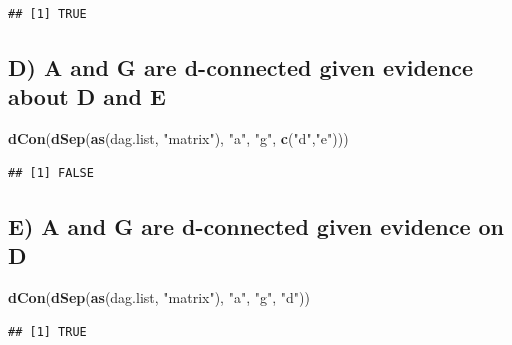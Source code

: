\documentclass[]{article}
\newenvironment{Shaded}{\begin{snugshade}}{\end{snugshade}}
\newcommand{\KeywordTok}[1]{\textcolor[rgb]{0.13,0.29,0.53}{\textbf{{#1}}}}
\newcommand{\StringTok}[1]{\textcolor[rgb]{0.31,0.60,0.02}{{#1}}}
\newcommand{\NormalTok}[1]{{#1}}
\begin{document}
\begin{verbatim}
## [1] TRUE
\end{verbatim}

\subsection{D) A and G are d-connected given evidence about D and
E}\label{d-a-and-g-are-d-connected-given-evidence-about-d-and-e}

\begin{Shaded}
\begin{Highlighting}[]
\KeywordTok{dCon}\NormalTok{(}\KeywordTok{dSep}\NormalTok{(}\KeywordTok{as}\NormalTok{(dag.list, }\StringTok{"matrix"}\NormalTok{), }\StringTok{"a"}\NormalTok{, }\StringTok{"g"}\NormalTok{, }\KeywordTok{c}\NormalTok{(}\StringTok{"d"}\NormalTok{,}\StringTok{"e"}\NormalTok{)))}
\end{Highlighting}
\end{Shaded}

\begin{verbatim}
## [1] FALSE
\end{verbatim}

\subsection{E) A and G are d-connected given evidence on
D}\label{e-a-and-g-are-d-connected-given-evidence-on-d}

\begin{Shaded}
\begin{Highlighting}[]
\KeywordTok{dCon}\NormalTok{(}\KeywordTok{dSep}\NormalTok{(}\KeywordTok{as}\NormalTok{(dag.list, }\StringTok{"matrix"}\NormalTok{), }\StringTok{"a"}\NormalTok{, }\StringTok{"g"}\NormalTok{, }\StringTok{"d"}\NormalTok{))}
\end{Highlighting}
\end{Shaded}

\begin{verbatim}
## [1] TRUE
\end{verbatim}
\end{document}
